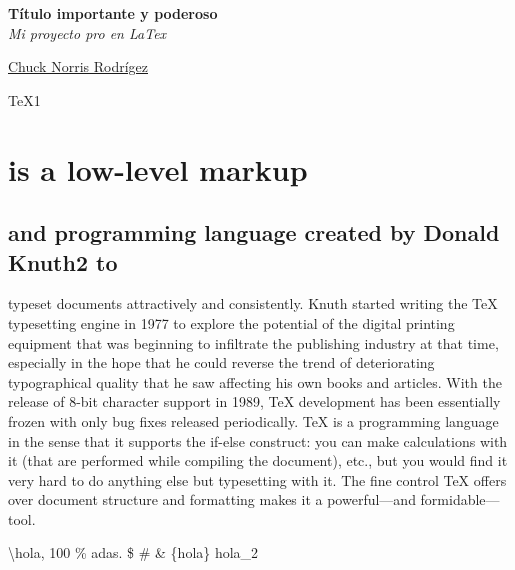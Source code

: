 \documentclass[a4paper,12pt]{article}
\newcommand{\fecha}{\DTMdate{2022-03-13}}
\newcommand{\titulo}{Título importante y poderoso}
\newcommand{\autor}{Chuck Norris Rodrígez}
\begin{document}
\begin{titlepage}
    \thispagestyle{empty}
    \begin{center}
    {\color{rojo} \LARGE \textbf {\titulo}} \\[1cm]

{\large \textit{Mi proyecto pro en LaTex}}

\underline{\autor}
\end{center}

\begin{flushright}
    \fecha
\end{flushright}
\end{titlepage}

\begin{flushright}
   \fecha
\end{flushright}

TeX1 \newline
 
\tableofcontents
\newpage
\section{\indent is a low-level markup}
\subsection{ \noindent and programming language created by Donald Knuth2 to }
typeset documents attractively and consistently. Knuth started writing the TeX typesetting
engine in 1977 to explore the potential of the digital printing equipment that was beginning
to infiltrate the publishing industry at that time, especially in the hope that he could reverse
the trend of deteriorating typographical quality that he saw aﬀecting his own books and
articles. With the release of 8-bit character support in 1989, TeX development has been
essentially frozen with only bug fixes released periodically. TeX is a programming language
in the sense that it supports the if-else construct: you can make calculations with it (that
are performed while compiling the document), etc., but you would find it very hard to do
anything else but typesetting with it. The fine control TeX oﬀers over document structure
and formatting makes it a powerful—and formidable—tool.

\textbackslash hola, 100 \% adas. \$ \# \& \{hola\} hola\_2
\end{document}
